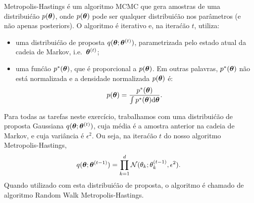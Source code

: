 Metropolis-Hastings \'e um algoritmo MCMC que gera amostras de uma
distribui\'c\~ao $p(\boldsymbol{\theta})$, onde $p(\boldsymbol{\theta})$ pode ser qualquer distribui\'c\~ao
nos par\^ametros (e n\~ao apenas posteriors). O algoritmo \'e iterativo
e, na itera\'c\~ao $t$, utiliza:
\begin{itemize}
    \item uma distribui\'c\~ao de proposta $q(\boldsymbol{\theta}; \boldsymbol{\theta}^{(t)})$, parametrizada pelo
    estado atual da cadeia de Markov, i.e.\ $\boldsymbol{\theta}^{(t)}$;
    \item uma fun\'c\~ao $p^*(\boldsymbol{\theta})$, que \'e proporcional a $p(\boldsymbol{\theta})$. Em outras
    palavras, $p^*(\boldsymbol{\theta})$ n\~ao est\'a normalizada e a densidade normalizada
    $p(\boldsymbol{\theta})$ \'e:
    \begin{equation} p(\boldsymbol{\theta}) = \frac{p^*(\boldsymbol{\theta})}{\int p^*(\boldsymbol{\theta}) \mathrm{d}\boldsymbol{\theta}}.
    \end{equation}
\end{itemize} 
Para todas as tarefas neste exerc\'icio, trabalhamos com uma distribui\'c\~ao de proposta
Gaussiana $q(\boldsymbol{\theta}; \boldsymbol{\theta}^{(t)})$, cuja m\'edia \'e a amostra anterior na cadeia de
Markov, e cuja vari\^ancia \'e $\epsilon^2$. Ou seja, na itera\'c\~ao $t$ do nosso
algoritmo Metropolis-Hastings,
\begin{equation}
    q(\boldsymbol{\theta}; \boldsymbol{\theta}^{(t-1)}) = \prod_{k=1}^d\mathcal{N}(\theta_k; \theta_k^{(t-1)}, \epsilon^2).
    \label{eq:gauss-prop-alt}
\end{equation}
Quando utilizado com esta distribui\'c\~ao de proposta, o algoritmo \'e
chamado de algoritmo Random Walk Metropolis-Hastings.
%


